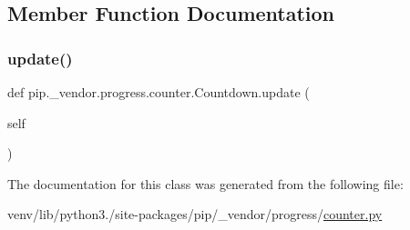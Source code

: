 \subsection{Member Function Documentation}
\mbox{\label{classpip_1_1__vendor_1_1progress_1_1counter_1_1Countdown_a3488ef039b3b0f97853fdde0560f2749}} 
\subsubsection{\texorpdfstring{update()}{update()}}
{\footnotesize\ttfamily def pip.\+\_\+vendor.\+progress.\+counter.\+Countdown.\+update (\begin{DoxyParamCaption}\item[{}]{self }\end{DoxyParamCaption})}



The documentation for this class was generated from the following file\+:\begin{DoxyCompactItemize}
\item 
venv/lib/python3./site-\/packages/pip/\+\_\+vendor/progress/\hyperlink{counter_8py}{counter.\+py}\end{DoxyCompactItemize}
